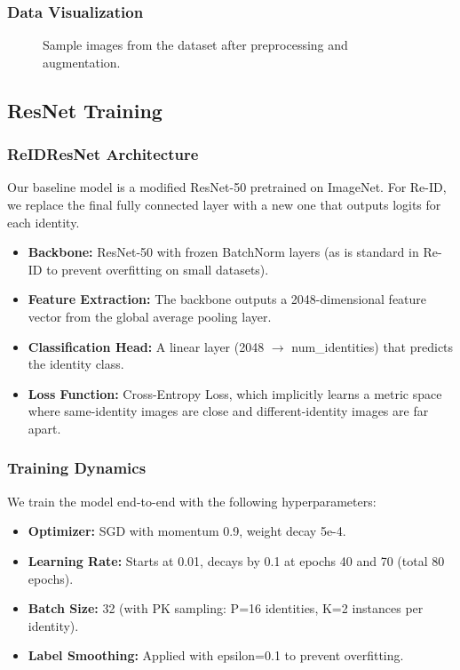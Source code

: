 \documentclass[a4paper,12pt]{article}
\begin{document}
\subsubsection*{Data Visualization}
\begin{figure}[H]
    \centering
    \caption{Sample images from the dataset after preprocessing and augmentation.}
    \label{fig:samples}
\end{figure}

\subsection{ResNet Training}

\subsubsection*{ReIDResNet Architecture}
Our baseline model is a modified ResNet-50 pretrained on ImageNet. For Re-ID, we replace the final fully connected layer with a new one that outputs logits for each identity.

\begin{itemize}
    \item \textbf{Backbone:} ResNet-50 with frozen BatchNorm layers (as is standard in Re-ID to prevent overfitting on small datasets).
    \item \textbf{Feature Extraction:} The backbone outputs a 2048-dimensional feature vector from the global average pooling layer.
    \item \textbf{Classification Head:} A linear layer (2048 $\to$ num\_identities) that predicts the identity class.
    \item \textbf{Loss Function:} Cross-Entropy Loss, which implicitly learns a metric space where same-identity images are close and different-identity images are far apart.
\end{itemize}

\subsubsection*{Training Dynamics}
We train the model end-to-end with the following hyperparameters:

\begin{itemize}
    \item \textbf{Optimizer:} SGD with momentum 0.9, weight decay 5e-4.
    \item \textbf{Learning Rate:} Starts at 0.01, decays by 0.1 at epochs 40 and 70 (total 80 epochs).
    \item \textbf{Batch Size:} 32 (with PK sampling: P=16 identities, K=2 instances per identity).
    \item \textbf{Label Smoothing:} Applied with epsilon=0.1 to prevent overfitting.
\end{itemize}
\end{document}

